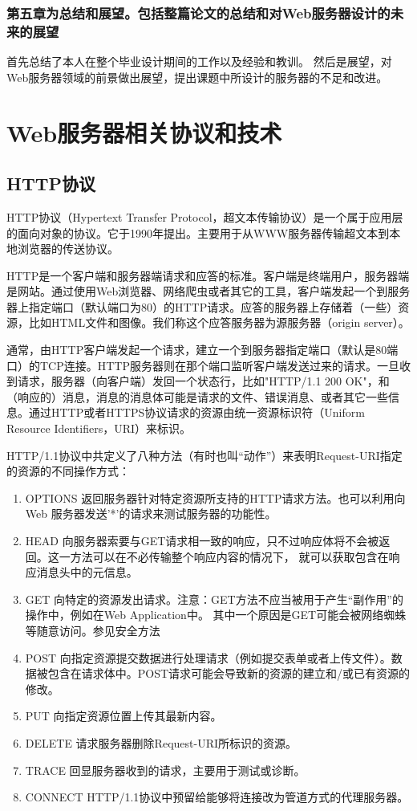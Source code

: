 \documentclass[12pt, twoside, a4paper, xetex]{report}
\begin{document}
	\subsection*{第五章为总结和展望。包括整篇论文的总结和对Web服务器设计的未来的展望}
		首先总结了本人在整个毕业设计期间的工作以及经验和教训。
		然后是展望，对Web服务器领域的前景做出展望，提出课题中所设计的服务器的不足和改进。
	
\chapter{Web服务器相关协议和技术}

\section{HTTP协议}
	HTTP协议（Hypertext Transfer Protocol，超文本传输协议）是一个属于应用层的面向对象的协议。它于1990年提出。主要用于从WWW服务器传输超文本到本地浏览器的传送协议。
	
	HTTP是一个客户端和服务器端请求和应答的标准。客户端是终端用户，服务器端是网站。通过使用Web浏览器、网络爬虫或者其它的工具，客户端发起一个到服务器上指定端口（默认端口为80）的HTTP请求。应答的服务器上存储着（一些）资源，比如HTML文件和图像。我们称这个应答服务器为源服务器（origin server）。
	
	通常，由HTTP客户端发起一个请求，建立一个到服务器指定端口（默认是80端口）的TCP连接。HTTP服务器则在那个端口监听客户端发送过来的请求。一旦收到请求，服务器（向客户端）发回一个状态行，比如"HTTP/1.1 200 OK"，和（响应的）消息，消息的消息体可能是请求的文件、错误消息、或者其它一些信息。通过HTTP或者HTTPS协议请求的资源由统一资源标识符（Uniform Resource Identifiers，URI）来标识。
	
	HTTP/1.1协议中共定义了八种方法（有时也叫“动作”）来表明Request-URI指定的资源的不同操作方式：
	\begin{enumerate}
		\item OPTIONS 返回服务器针对特定资源所支持的HTTP请求方法。也可以利用向Web 服务器发送'*'的请求来测试服务器的功能性。
		\item HEAD 向服务器索要与GET请求相一致的响应，只不过响应体将不会被返回。这一方法可以在不必传输整个响应内容的情况下，
					就可以获取包含在响应消息头中的元信息。
		\item GET 向特定的资源发出请求。注意：GET方法不应当被用于产生“副作用”的操作中，例如在Web Application中。
					其中一个原因是GET可能会被网络蜘蛛等随意访问。参见安全方法
		\item POST 向指定资源提交数据进行处理请求（例如提交表单或者上传文件）。数据被包含在请求体中。POST请求可能会导致新的资源的建立和/或已有资源的修改。
		\item PUT 向指定资源位置上传其最新内容。
		\item DELETE 请求服务器删除Request-URI所标识的资源。
		\item TRACE 回显服务器收到的请求，主要用于测试或诊断。
		\item CONNECT HTTP/1.1协议中预留给能够将连接改为管道方式的代理服务器。
	\end{enumerate}
	
\end{document}
